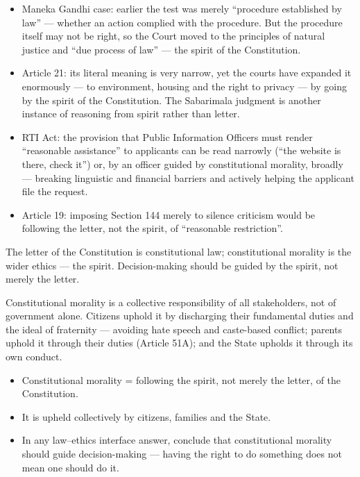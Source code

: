 \begin{ExampleBox}
\begin{itemize}
\item Maneka Gandhi case: earlier the test was merely ``procedure established by law'' --- whether an action complied with the procedure. But the procedure itself may not be right, so the Court moved to the principles of natural justice and ``due process of law'' --- the spirit of the Constitution.
\item Article 21: its literal meaning is very narrow, yet the courts have expanded it enormously --- to environment, housing and the right to privacy --- by going by the spirit of the Constitution. The Sabarimala judgment is another instance of reasoning from spirit rather than letter.
\end{itemize}
\end{ExampleBox}

\begin{GovtPolicy}
\begin{itemize}
\item RTI Act: the provision that Public Information Officers must render ``reasonable assistance'' to applicants can be read narrowly (``the website is there, check it'') or, by an officer guided by constitutional morality, broadly --- breaking linguistic and financial barriers and actively helping the applicant file the request.
\item Article 19: imposing Section 144 merely to silence criticism would be following the letter, not the spirit, of ``reasonable restriction''.
\end{itemize}
\end{GovtPolicy}

\begin{CriticalPoint}
The letter of the Constitution is constitutional law; constitutional morality is the wider ethics --- the spirit. Decision-making should be guided by the spirit, not merely the letter.
\end{CriticalPoint}

Constitutional morality is a collective responsibility of all stakeholders, not of government alone. Citizens uphold it by discharging their fundamental duties and the ideal of fraternity --- avoiding hate speech and caste-based conflict; parents uphold it through their duties (Article 51A); and the State upholds it through its own conduct.

\begin{QuickRevision}
\begin{itemize}
\item Constitutional morality = following the spirit, not merely the letter, of the Constitution.
\item It is upheld collectively by citizens, families and the State.
\item In any law--ethics interface answer, conclude that constitutional morality should guide decision-making --- having the right to do something does not mean one should do it.
\end{itemize}
\end{QuickRevision}

